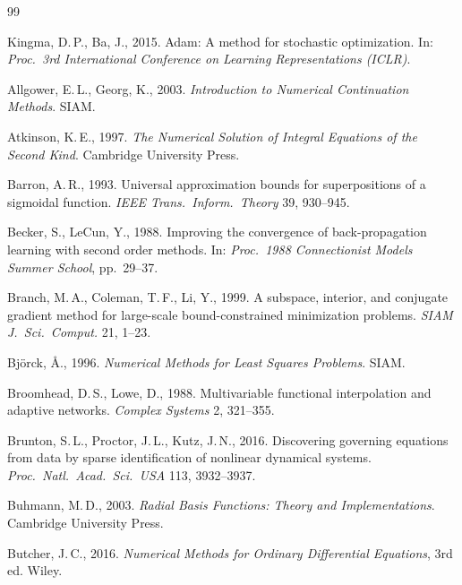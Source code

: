 \documentclass[preprint,12pt,numbers]{elsarticle}
\begin{document}

\begin{thebibliography}{99}

Kingma, D.\,P., Ba, J., 2015. Adam: A method for stochastic optimization.
In: \emph{Proc.\ 3rd International Conference on Learning Representations
(ICLR)}.

Allgower, E.\,L., Georg, K., 2003. \emph{Introduction to Numerical
Continuation Methods}. SIAM.

Atkinson, K.\,E., 1997. \emph{The Numerical Solution of Integral Equations
of the Second Kind}. Cambridge University Press.

Barron, A.\,R., 1993. Universal approximation bounds for superpositions
of a sigmoidal function. \emph{IEEE Trans.\ Inform.\ Theory} 39,
930--945.

Becker, S., LeCun, Y., 1988. Improving the convergence of
back-propagation learning with second order methods. In: \emph{Proc.\
1988 Connectionist Models Summer School}, pp.\ 29--37.

Branch, M.\,A., Coleman, T.\,F., Li, Y., 1999. A subspace, interior,
and conjugate gradient method for large-scale bound-constrained
minimization problems. \emph{SIAM J.\ Sci.\ Comput.} 21, 1--23.

Bj\"orck, \AA., 1996. \emph{Numerical Methods for Least Squares Problems}.
SIAM.

Broomhead, D.\,S., Lowe, D., 1988. Multivariable functional interpolation
and adaptive networks. \emph{Complex Systems} 2, 321--355.

Brunton, S.\,L., Proctor, J.\,L., Kutz, J.\,N., 2016. Discovering
governing equations from data by sparse identification of nonlinear
dynamical systems. \emph{Proc.\ Natl.\ Acad.\ Sci.\ USA} 113,
3932--3937.

Buhmann, M.\,D., 2003. \emph{Radial Basis Functions: Theory and
Implementations}. Cambridge University Press.

Butcher, J.\,C., 2016. \emph{Numerical Methods for Ordinary Differential
Equations}, 3rd ed. Wiley.


\end{thebibliography}
\end{document}
